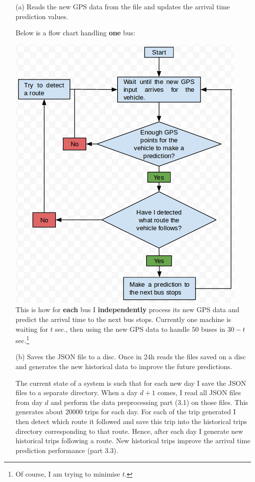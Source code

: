 \documentclass[12pt,a4paper,oneside,openright]{report}
\begin{document}
\begin{enumerate}

\item[(a)] Reads the new GPS data from the file and updates the arrival time
prediction values.

Below is a flow chart handling
\textbf{one} bus:

\includegraphics[scale = 0.6]{figs/flowchart.png} \\

This is how for \textbf{each} bus I \textbf{independently} process its new GPS data
and predict the arrival time to the next bus stops. Currently one machine is
waiting for $t$ sec., then using the new GPS data to handle $50$ buses in 
$30 - t$ sec.\footnote{Of course, I am trying to minimise $t$.}

\item[(b)] Saves the JSON file to a disc. Once in 24h reads the files saved on a disc
and generates the new historical data to improve the future predictions.

The current state of a system is such that for each new day I save the JSON files
to a separate directory. When a day $d+1$ comes, I read all JSON files from day $d$
and perform the data preprocessing part (3.1) on those files. This generates
about $20000$ trips for each day. For each of the trip generated I then detect
which route it followed and save this trip into the historical trips directory
corresponding to that route. Hence, after each day I generate new historical trips
following a route. New historical trips improve the arrival time prediction
performance (part 3.3).


\end{enumerate}
\end{document}
